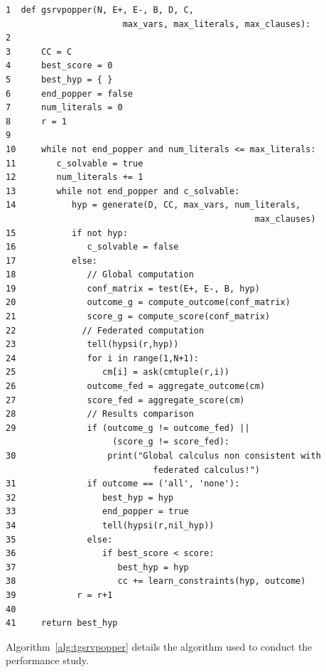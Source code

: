\begin{algorithm}[!t]
  \caption{Srvpopper client for correctness tests}
  \label{alg:gsrvpopper}
  \small
  \begin{lstlisting}[breaklines=true, breakatwhitespace=true]
1  def gsrvpopper(N, E+, E-, B, D, C, 
                       max_vars, max_literals, max_clauses):
2  
3      CC = C
4      best_score = 0
5      best_hyp = { }
6      end_popper = false
7      num_literals = 0
8      r = 1
9  
10     while not end_popper and num_literals <= max_literals:
11        c_solvable = true
12        num_literals += 1
13        while not end_popper and c_solvable:
14           hyp = generate(D, CC, max_vars, num_literals, 
                                                 max_clauses)
15           if not hyp:
16              c_solvable = false
17           else:
18              // Global computation
19              conf_matrix = test(E+, E-, B, hyp)
20              outcome_g = compute_outcome(conf_matrix)
21              score_g = compute_score(conf_matrix)
22             // Federated computation
23              tell(hypsi(r,hyp))
24              for i in range(1,N+1):
25                 cm[i] = ask(cmtuple(r,i))
26              outcome_fed = aggregate_outcome(cm)
27              score_fed = aggregate_score(cm)
28              // Results comparison
29              if (outcome_g != outcome_fed) ||
                     (score_g != score_fed):
30                  print("Global calculus non consistent with 
                             federated calculus!")
31              if outcome == ('all', 'none'):
32                 best_hyp = hyp
33                 end_popper = true
34                 tell(hypsi(r,nil_hyp))                
35              else:
36                 if best_score < score:
37                    best_hyp = hyp
38                    cc += learn_constraints(hyp, outcome)
39            r = r+1
40                    
41     return best_hyp
  \end{lstlisting}
\end{algorithm}




Algorithm~\ref{alg:tgsrvpopper} details the algorithm used to conduct the performance study.

